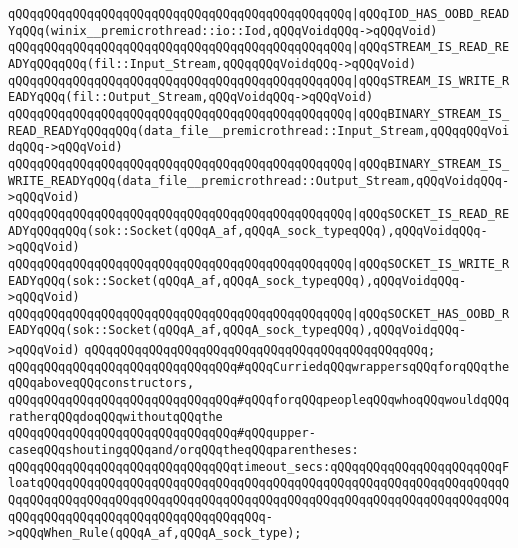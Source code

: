 \verb|qQQqqQQqqQQqqQQqqQQqqQQqqQQqqQQqqQQqqQQqqQQqqQQq|\verb#|qQQqIOD_HAS_OOBD_READYqQQq(winix__premicrothread::io::Iod,qQQqVoidqQQq->qQQqVoid)#\newline
\newline
\verb|qQQqqQQqqQQqqQQqqQQqqQQqqQQqqQQqqQQqqQQqqQQqqQQq|\verb#|qQQqSTREAM_IS_READ_READYqQQqqQQq(fil::Input_Stream,qQQqqQQqVoidqQQq->qQQqVoid)#\newline
\verb|qQQqqQQqqQQqqQQqqQQqqQQqqQQqqQQqqQQqqQQqqQQqqQQq|\verb#|qQQqSTREAM_IS_WRITE_READYqQQq(fil::Output_Stream,qQQqVoidqQQq->qQQqVoid)#\newline
\newline
\verb|qQQqqQQqqQQqqQQqqQQqqQQqqQQqqQQqqQQqqQQqqQQqqQQq|\verb#|qQQqBINARY_STREAM_IS_READ_READYqQQqqQQq(data_file__premicrothread::Input_Stream,qQQqqQQqVoidqQQq->qQQqVoid)#\newline
\verb|qQQqqQQqqQQqqQQqqQQqqQQqqQQqqQQqqQQqqQQqqQQqqQQq|\verb#|qQQqBINARY_STREAM_IS_WRITE_READYqQQq(data_file__premicrothread::Output_Stream,qQQqVoidqQQq->qQQqVoid)#\newline
\newline
\verb|qQQqqQQqqQQqqQQqqQQqqQQqqQQqqQQqqQQqqQQqqQQqqQQq|\verb#|qQQqSOCKET_IS_READ_READYqQQqqQQq(sok::Socket(qQQqA_af,qQQqA_sock_typeqQQq),qQQqVoidqQQq->qQQqVoid)#\newline
\verb|qQQqqQQqqQQqqQQqqQQqqQQqqQQqqQQqqQQqqQQqqQQqqQQq|\verb#|qQQqSOCKET_IS_WRITE_READYqQQq(sok::Socket(qQQqA_af,qQQqA_sock_typeqQQq),qQQqVoidqQQq->qQQqVoid)#\newline
\verb|qQQqqQQqqQQqqQQqqQQqqQQqqQQqqQQqqQQqqQQqqQQqqQQq|\verb#|qQQqSOCKET_HAS_OOBD_READYqQQq(sok::Socket(qQQqA_af,qQQqA_sock_typeqQQq),qQQqVoidqQQq->qQQqVoid)#\newline
\verb|qQQqqQQqqQQqqQQqqQQqqQQqqQQqqQQqqQQqqQQqqQQqqQQq;|\newline
\newline
\newline
\newline
\verb|qQQqqQQqqQQqqQQqqQQqqQQqqQQqqQQq#qQQqCurriedqQQqwrappersqQQqforqQQqtheqQQqaboveqQQqconstructors,|\newline
\verb|qQQqqQQqqQQqqQQqqQQqqQQqqQQqqQQq#qQQqforqQQqpeopleqQQqwhoqQQqwouldqQQqratherqQQqdoqQQqwithoutqQQqthe|\newline
\verb|qQQqqQQqqQQqqQQqqQQqqQQqqQQqqQQq#qQQqupper-caseqQQqshoutingqQQqand/orqQQqtheqQQqparentheses:|\newline
\newline
\verb|qQQqqQQqqQQqqQQqqQQqqQQqqQQqqQQqtimeout_secs:qQQqqQQqqQQqqQQqqQQqqQQqFloatqQQqqQQqqQQqqQQqqQQqqQQqqQQqqQQqqQQqqQQqqQQqqQQqqQQqqQQqqQQqqQQqqQQqqQQqqQQqqQQqqQQqqQQqqQQqqQQqqQQqqQQqqQQqqQQqqQQqqQQqqQQqqQQqqQQqqQQqqQQqqQQqqQQqqQQqqQQqqQQqqQQqqQQqqQQq->qQQqWhen_Rule(qQQqA_af,qQQqA_sock_type);|\newline
